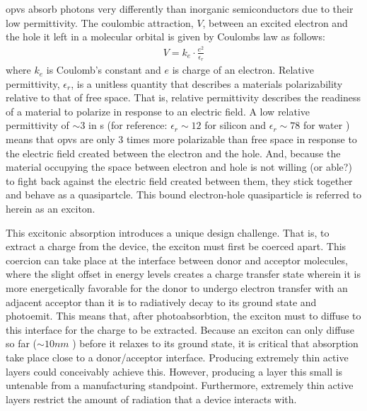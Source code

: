 \gls{opv}s absorb photons very differently than inorganic semiconductors due to their low
permittivity. 
The coulombic attraction, $V$, between an excited
electron and the hole it left in a molecular orbital
is given by Coulombs law as follows:
\begin{align}
    \label{coulomb}
    V  = k_{e} \cdot \frac{e^{2}}{\epsilon_{r}}
\end{align}
where $k_{e}$ is Coulomb's constant and $e$ is charge of an electron.
Relative permittivity, $\epsilon_{r}$, is a unitless quantity that describes a materials polarizability relative to that of free space.
That is, relative
permittivity describes the readiness of a material
to polarize in response to an electric field. 
A low
relative permittivity of ${\sim}3$ in s (for reference: $\epsilon_{r}{\sim}12$ for silicon
\cite{Baroni1986} and $\epsilon_{r}{\sim}78$ for water \cite{George2004})
means that \gls{opv}s are only $3$ times more polarizable than free space in response to the electric field
created between the electron and the hole. 
And, because the material occupying the space between electron and hole %
is not willing (or able?) to fight back against the electric field created between them, they stick together and behave as a quasipartcle. 
This bound electron-hole quasiparticle is referred to herein as an exciton.

This excitonic absorption introduces a unique design challenge.
That is, to extract a charge from the device, the exciton
must first be coerced apart.
This coercion can take place at the interface between donor and acceptor molecules,
where the slight offset in energy levels creates a charge transfer state wherein it is more
energetically favorable for the donor to undergo electron transfer with an adjacent acceptor than
it is to radiatively decay to its ground state and photoemit.
This means that, after photoabsorbtion, the exciton must to diffuse to this interface for the charge to be
extracted.
Because an exciton can only diffuse so far (${\sim}10nm$ \cite{clarke2010}) before it relaxes to
its ground state, it is critical that absorption take place close to a donor/acceptor
interface. 
Producing extremely thin active layers could conceivably achieve this.
However,
producing a layer this small is untenable from a manufacturing standpoint.
Furthermore, extremely thin active
layers restrict the amount of radiation that a device interacts with. 

